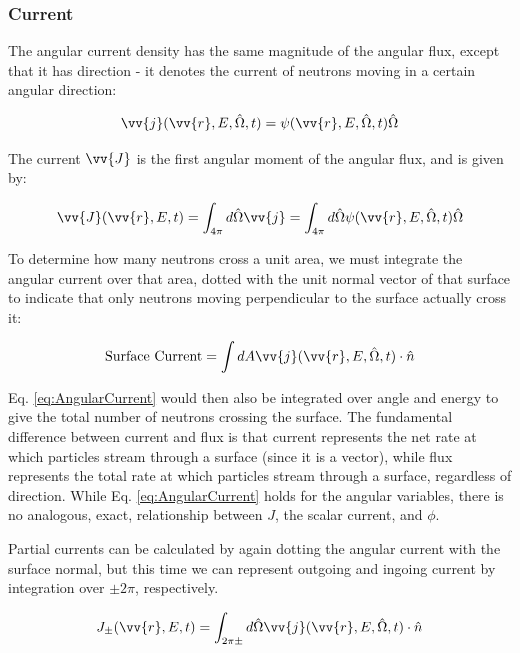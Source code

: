 \documentclass[10pt]{article}
\begin{document}
\begin{flushleft}
\subsubsection{Current}

The angular current density has the same magnitude of the angular flux, except that it has direction - it denotes the current of neutrons moving in a certain angular direction:

\begin{equation}
\label{eq:AngularCurrent}
\vv{j}(\vv{r}, E, \hat{\Omega}, t) = \psi(\vv{r}, E, \hat{\Omega}, t)\hat{\Omega}
\end{equation}

The current \(\vv{J}\) is the first angular moment of the angular flux, and is given by:

\begin{equation}
\label{eq:Current}
\vv{J}(\vv{r},E,t)=\int_{4\pi}^{}d\hat{\Omega}\vv{j}=\int_{4\pi}^{}d\hat{\Omega}\psi(\vv{r},E,\hat{\Omega},t)\hat{\Omega}
\end{equation}

To determine how many neutrons cross a unit area, we must integrate the angular current over that area, dotted with the unit normal vector of that surface to indicate that only neutrons moving perpendicular to the surface actually cross it:

\begin{equation}
\label{eq:AngularCurrent}
\textrm{Surface Current} = \int dA \vv{j}(\vv{r}, E, \hat{\Omega}, t)\cdot\hat{n}
\end{equation}

Eq. \ref{eq:AngularCurrent} would then also be integrated over angle and energy to give the total number of neutrons crossing the surface. The fundamental difference between current and flux is that current represents the net rate at which particles stream through a surface (since it is a vector), while flux represents the total rate at which particles stream through a surface, regardless of direction. While Eq. \ref{eq:AngularCurrent} holds for the angular variables, there is no analogous, exact, relationship between \(J\), the scalar current, and \(\phi\). 

Partial currents can be calculated by again dotting the angular current with the surface normal, but this time we can represent outgoing and ingoing current by integration over \(\pm 2\pi\), respectively.

\begin{equation}
\label{eq:PartialCurrent}
J_\pm (\vv{r}, E, t) = \int_{2\pi\pm}^{} d\hat{\Omega} \vv{j}(\vv{r}, E, \hat{\Omega}, t)\cdot\hat{n}
\end{equation}


\end{flushleft}
\end{document}
